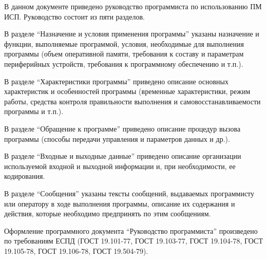 \Annotation

В данном документе приведено руководство программиста по использованию ПМ ИСП.
Руководство состоит из пяти разделов.

В разделе ``Назначение и условия применения программы'' указаны назначение и функции, выполняемые программой, условия, необходимые для выполнения программы (объем оперативной памяти, требования к составу и параметрам периферийных устройств, требования к программному обеспечению и т.п.).

В разделе ``Характеристики программы'' приведено описание основных характеристик и особенностей программы (временные характеристики, режим работы, средства контроля правильности выполнения и самовосстанавливаемости программы и т.п.).

В разделе ``Обращение к программе'' приведено описание процедур вызова программы (способы передачи управления и параметров данных и др.).

В разделе ``Входные и выходные данные'' приведено описание организации используемой входной и выходной информации и, при необходимости, ее кодирования.

В разделе ``Сообщения'' указаны тексты сообщений, выдаваемых программисту или оператору в ходе выполнения программы, описание их содержания и действия, которые необходимо предпринять по этим сообщениям.

Оформление программного документа ``Руководство программиста'' произведено по требованиям ЕСПД (ГОСТ 19.101-77, ГОСТ 19.103-77, ГОСТ 19.104-78, ГОСТ 19.105-78, ГОСТ 19.106-78, ГОСТ 19.504-79).
